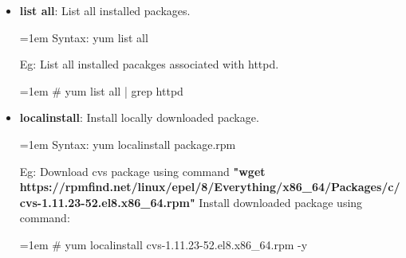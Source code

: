 \begin{flushleft}
\begin{itemize}
		\item \textbf{list all}: List all installed packages.
		\begin{tcolorbox}[breakable,notitle,boxrule=-0pt,colback=pink,colframe=pink]
			\color{black}
			\font=1em
			Syntax: yum list all
			\font=4pt
		\end{tcolorbox}
		Eg: List all installed pacakges associated with httpd.
		\begin{tcolorbox}[breakable,notitle,boxrule=-0pt,colback=black,colframe=black]
			\color{green}
			\font=1em
			\# yum list all | grep httpd
			\font=4pt
		\end{tcolorbox}
		\bigskip
		\bigskip					

		\item \textbf{localinstall}: Install locally downloaded package.
		\begin{tcolorbox}[breakable,notitle,boxrule=-0pt,colback=pink,colframe=pink]
			\color{black}
			\font=1em
			Syntax: yum localinstall package.rpm
			\font=4pt
		\end{tcolorbox}
		Eg: Download cvs package using command \textbf{"wget https://rpmfind.net/linux/epel/8/Everything/x86\_64/Packages/c/cvs-1.11.23-52.el8.x86\_64.rpm"}
		\newline
		 Install downloaded package using command:
		\begin{tcolorbox}[breakable,notitle,boxrule=-0pt,colback=black,colframe=black]
			\color{green}
			\font=1em
			\# yum localinstall cvs-1.11.23-52.el8.x86\_64.rpm -y
			\font=4pt
		\end{tcolorbox}
		\bigskip
		\bigskip					

		
	\end{itemize}
	
	
\end{flushleft}
\newpage



